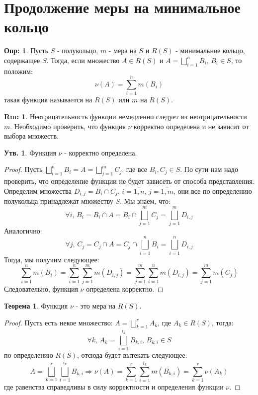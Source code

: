 \documentclass[12pt]{article}
\theoremstyle{definition}
\newtheorem{defn}{Опр:}
\newtheorem{rem}{Rm:}
\newtheorem{prop}{Утв.}
\newtheorem{theorem}{Теорема}
\begin{document}
\section*{Продолжение меры на минимальное кольцо}
\begin{defn}
	Пусть $S$ - полукольцо, $m$ - мера на $S$ и $R(S)$ - минимальное кольцо, содержащее $S$. Тогда, если множество $A \in R(S)$ и $A = \bigsqcup\limits_{i = 1}^{n}B_i, \, B_i \in S$, то положим:
	$$
		\nu(A) = \sum\limits_{i = 1}^{n}m(B_i)
	$$
	такая функция называeтся  на $R(S)$ или  $m$ на $R(S)$.
\end{defn}
\begin{rem}
	Неотрицательность функции немедленно следует из неотрицательности $m$. Необходимо проверить, что функция $\nu$ корректно определена и не зависит от выбора множеств.
\end{rem}
\begin{prop}
	Функция $\nu$ - корректно определена.
\end{prop}
\begin{proof}
	Пусть $\bigsqcup\limits_{i = 1}^{n}B_i = A = \bigsqcup\limits_{j = 1}^{m} C_j$, где все $B_i, C_j \in S$. По сути нам надо проверить, что определение функции не будет зависеть от способа представления. Определим множества $D_{i,j} = B_i \cap C_j, \, i = \overline{1,n}, \, j = \overline{1,m}$, они все по определению полукольца принадлежат множеству $S$. Мы знаем, что: 
	$$
		\forall i, \, B_i = B_i \cap A = B_i \cap \bigsqcup\limits_{j = 1}^{m} C_j  = \bigsqcup\limits_{j = 1}^m D_{i,j}
	$$
	Аналогично:
	$$
		\forall j, \, C_j = C_j \cap A = C_j \cap \bigsqcup\limits_{i = 1}^{n} B_i  = \bigsqcup\limits_{i = 1}^n D_{i,j}
	$$
	Тогда, мы получим следующее:
	$$
		\sum\limits_{i = 1}^{n}m(B_i) = \sum\limits_{i = 1}^{n}\sum\limits_{j = 1}^m m(D_{i,j}) = \sum\limits_{j = 1}^{m}\sum\limits_{i = 1}^n m(D_{i,j}) = \sum\limits_{j = 1}^{m}m(C_j)
	$$
	Следовательно, функция $\nu$ определена корректно.
\end{proof}
\begin{theorem}
	Функция $\nu$ - это мера на $R(S)$.
\end{theorem}
\begin{proof}
	Пусть есть некое множество: $A = \bigsqcup\limits_{k = 1}^{r}A_k$, где $A_k \in R(S)$, тогда:
	$$
		\forall k, \, A_k = \bigsqcup\limits_{i = 1}^{i_k} B_{k,i}, \, B_{k,i} \in S
	$$
	по определению $R(S)$, отсюда будет вытекать следующее:
	$$
		A = \bigsqcup\limits_{k = 1}^{r} \bigsqcup\limits_{i = 1}^{i_k}B_{k,i} \Rightarrow \nu(A) = \sum\limits_{k = 1}^{r}\sum\limits_{i = 1}^{i_k}m(B_{k,i}) = \sum\limits_{k = 1}^r \nu(A_k)
	$$
	где равенства справедливы в силу корректности и определения функции $\nu$.
\end{proof}
\end{document}
